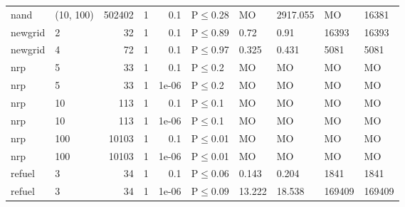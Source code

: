 \begin{longtable}{llrrrlllll}
 nand          & (10, 100) & 	502402 & 1 & 0.1   & P$\leq$0.28  & MO      & 2917.055 & MO     & 16381   \\
 newgrid       & 2         &     	32 & 1 & 0.1   & P$\leq$0.89  & 0.72    & 0.91     & 16393  & 16393   \\
 newgrid       & 4         &     	72 & 1 & 0.1   & P$\leq$0.97  & 0.325   & 0.431    & 5081   & 5081    \\
 nrp           & 5         &     	33 & 1 & 0.1   & P$\leq$0.2   & MO      & MO       & MO     & MO      \\
 nrp           & 5         &     	33 & 1 & 1e-06 & P$\leq$0.2   & MO      & MO       & MO     & MO      \\
 nrp           & 10        &    	113 & 1 & 0.1   & P$\leq$0.1   & MO      & MO       & MO     & MO      \\
 nrp           & 10        &    	113 & 1 & 1e-06 & P$\leq$0.1   & MO      & MO       & MO     & MO      \\
 nrp           & 100       &  	10103 & 1 & 0.1   & P$\leq$0.01  & MO      & MO       & MO     & MO      \\
 nrp           & 100       &  	10103 & 1 & 1e-06 & P$\leq$0.01  & MO      & MO       & MO     & MO      \\
 refuel        & 3         &     	34 & 1 & 0.1   & P$\leq$0.06  & 0.143   & 0.204    & 1841   & 1841    \\
 refuel        & 3         &     	34 & 1 & 1e-06 & P$\leq$0.09  & 13.222  & 18.538   & 169409 & 169409  \\
\bottomrule
\end{longtable}
